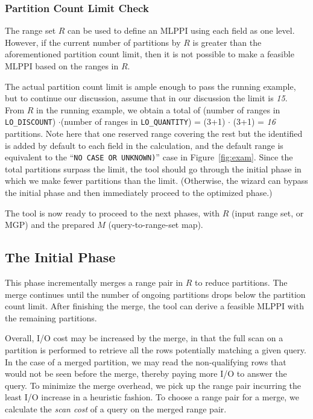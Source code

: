 \documentclass[runningheads]{comsis2}
\begin{document}
\subsubsection{Partition Count Limit Check}

The range set $R$ can be used to define an MLPPI using each field as one level. 
However, if the current number of partitions by $R$ is greater than 
the aforementioned partition count limit, 
then it is not possible to make a feasible MLPPI based on the ranges in $R$. 

The actual partition count limit is ample enough to pass the running example, 
but to continue our discussion, assume that in our discussion the limit is {\it 15}.
From $R$ in the running example, we obtain a total of (number of ranges in {\tt LO\_DISCOUNT}) 
$\cdot$(number of ranges in {\tt LO\_QUANTITY}) = (3+1) $\cdot$ (3+1) = {\it 16}
partitions. Note here that one reserved range covering the rest but the identified 
is added by default to each field in the calculation, 
and the default range is equivalent to the ``{\tt NO CASE OR UNKNOWN)}'' case in Figure~\ref{fig:exam}. 
Since the total partitions surpass the limit, 
the tool should go through the initial phase in which 
we make fewer partitions than the limit. 
(Otherwise, the wizard can bypass the initial phase and then immediately proceed to the optimized phase.) 

The tool is now ready to proceed to the next phases, 
with $R$ (input range set, or MGP) and the prepared $M$ (query-to-range-set map). 

\subsection{The Initial Phase}
\label{sec:init_phase}

This phase incrementally merges a range pair in $R$ to reduce partitions. 
The merge continues until the number of ongoing partitions 
drops below the partition count limit. 
After finishing the merge, the tool can derive a feasible MLPPI with the remaining partitions. 

Overall, I/O cost may be increased by the merge, 
in that the full scan on a partition is performed to retrieve all the rows potentially matching a given query. 
In the case of a merged partition, we may read the non-qualifying rows 
that would not be seen before the merge, thereby paying more I/O to answer 
the query. To minimize the merge overhead, we pick up the range pair incurring 
the least I/O increase in a heuristic fashion. 
To choose a range pair for a merge, 
we calculate the {\em scan cost} of a query on the merged range pair.
\end{document}
